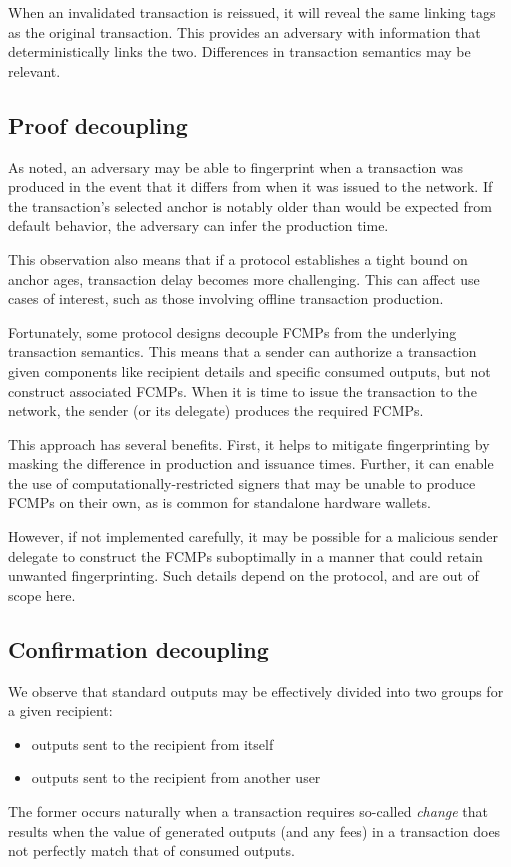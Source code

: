 \documentclass{article}
\theoremstyle{definition}
\begin{document}
When an invalidated transaction is reissued, it will reveal the same linking tags as the original transaction.
This provides an adversary with information that deterministically links the two.
Differences in transaction semantics may be relevant.


\subsection{Proof decoupling}

As noted, an adversary may be able to fingerprint when a transaction was produced in the event that it differs from when it was issued to the network.
If the transaction's selected anchor is notably older than would be expected from default behavior, the adversary can infer the production time.

This observation also means that if a protocol establishes a tight bound on anchor ages, transaction delay becomes more challenging.
This can affect use cases of interest, such as those involving offline transaction production.

Fortunately, some protocol designs decouple FCMPs from the underlying transaction semantics.
This means that a sender can authorize a transaction given components like recipient details and specific consumed outputs, but not construct associated FCMPs.
When it is time to issue the transaction to the network, the sender (or its delegate) produces the required FCMPs.

This approach has several benefits.
First, it helps to mitigate fingerprinting by masking the difference in production and issuance times.
Further, it can enable the use of computationally-restricted signers that may be unable to produce FCMPs on their own, as is common for standalone hardware wallets.

However, if not implemented carefully, it may be possible for a malicious sender delegate to construct the FCMPs suboptimally in a manner that could retain unwanted fingerprinting.
Such details depend on the protocol, and are out of scope here.


\subsection{Confirmation decoupling}

We observe that standard outputs may be effectively divided into two groups for a given recipient:
\begin{itemize}
\item outputs sent to the recipient from itself
\item outputs sent to the recipient from another user
\end{itemize}
The former occurs naturally when a transaction requires so-called \textit{change} that results when the value of generated outputs (and any fees) in a transaction does not perfectly match that of consumed outputs.
\end{document}

